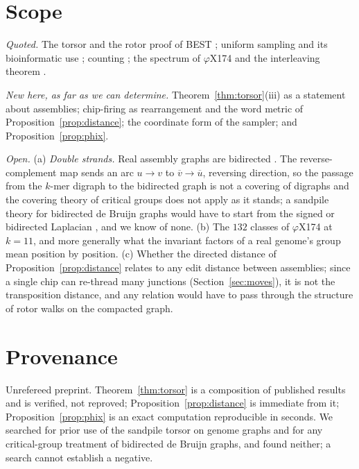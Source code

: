 \documentclass[11pt]{article}
\theoremstyle{plain}
\theoremstyle{definition}
\theoremstyle{remark}
\begin{document}
\section{Scope}\label{sec:scope}

\emph{Quoted.} The torsor and the rotor proof of BEST \cite{HLMPPW}; uniform sampling
\cite{CMN,PW,Wilson,CC} and its bioinformatic use \cite{AE,KMUW,uShuffle}; counting
\cite{ABCS,KSP}; the spectrum of $\varphi$X174 and the interleaving theorem \cite{Bio1}.

\emph{New here, as far as we can determine.} Theorem~\ref{thm:torsor}(iii) as a statement
about assemblies; chip-firing as rearrangement and the word metric of
Proposition~\ref{prop:distance}; the coordinate form of the sampler; and
Proposition~\ref{prop:phix}.

\emph{Open.} (a) \emph{Double strands.} Real assembly graphs are bidirected
\cite{KM,MB}. The reverse-complement map sends an arc $u\to v$ to $\overline v\to\overline u$,
reversing direction, so the passage from the $k$-mer digraph to the bidirected graph is not
a covering of digraphs and the covering theory of critical groups \cite{RT} does not apply
as it stands; a sandpile theory for bidirected de Bruijn graphs would have to start from
the signed or bidirected Laplacian \cite{Zaslavsky}, and we know of none. (b) The $132$
classes of $\varphi$X174 at $k=11$, and more generally what the invariant factors of a
real genome's group mean position by position. (c) Whether the directed distance of
Proposition~\ref{prop:distance} relates to any edit distance between assemblies; since a
single chip can re-thread many junctions (Section~\ref{sec:moves}), it is not the
transposition distance, and any relation would have to pass through the structure of
rotor walks on the compacted graph.

\section*{Provenance}

Unrefereed preprint. Theorem~\ref{thm:torsor} is a composition of published results and is
verified, not reproved; Proposition~\ref{prop:distance} is immediate from it;
Proposition~\ref{prop:phix} is an exact computation reproducible in seconds. We searched
for prior use of the sandpile torsor on genome graphs and for any critical-group treatment
of bidirected de Bruijn graphs, and found neither; a search cannot establish a negative.
\end{document}
